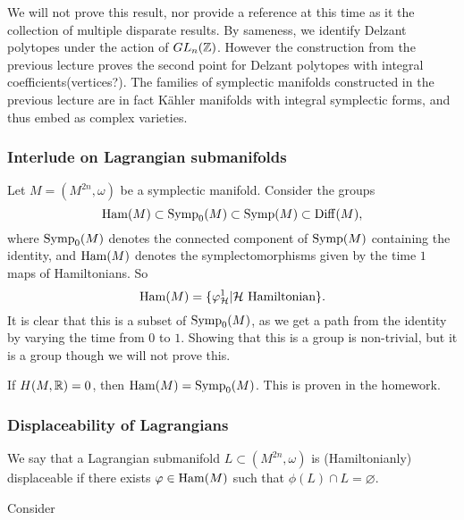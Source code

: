 \begin{remark}
	We will not prove this result, nor provide a reference at this time as it the collection of multiple disparate results.
	By sameness, we identify Delzant polytopes under the action of $GL_n(\mathbb{Z})$.
	However the construction from the previous lecture proves the second point for Delzant polytopes with integral coefficients(vertices?).
	The families of symplectic manifolds constructed in the previous lecture are in fact Kähler manifolds with integral symplectic forms, and thus embed as complex varieties.
\end{remark}

\subsubsection*{Interlude on Lagrangian submanifolds}
Let $M=(M^{2n},\omega)$ be a symplectic manifold.
Consider the groups
\[\operatorname{Ham}(M)\subset\operatorname{Symp}_0(M)\subset\operatorname{Symp}(M)\subset\operatorname{Diff}(M),\]
where $\operatorname{Symp}_0(M)$ denotes the connected component of $\operatorname{Symp}(M)$ containing the identity, and $\operatorname{Ham}(M)$ denotes the symplectomorphisms given by the time $1$ maps of Hamiltonians.
So
\[\operatorname{Ham}(M)=\{\varphi_{\mathcal{H}}^1|\mathcal{H}\text{ Hamiltonian}\}.\]
It is clear that this is a subset of $\operatorname{Symp}_0(M)$, as we get a path from the identity by varying the time from $0$ to $1$.
Showing that this is a group is non-trivial, but it is a group though we will not prove this.

\begin{remark}
	If $H(M,\mathbb{R})=0$, then $\operatorname{Ham}(M)=\operatorname{Symp}_0(M)$.
	This is proven in the homework.
\end{remark}


\subsubsection*{Displaceability of Lagrangians}

\begin{dfn}
	We say that a Lagrangian submanifold $L\subset(M^{2n},\omega)$ is (Hamiltonianly) displaceable if there exists $\varphi\in\operatorname{Ham}(M)$ such that $\phi(L)\cap L=\varnothing$.
\end{dfn}

\begin{example}
    Consider
\end{example}

